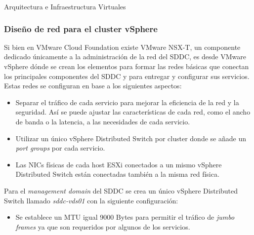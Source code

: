\begin{subsection}{Arquitectura e Infraestructura Virtuales\cite{CFVirtInfraes}}
\begin{itemize}
\end{itemize}
\subsubsection{Diseño de red para el cluster vSphere}
Si bien en VMware Cloud Foundation existe VMware NSX-T, un componente dedicado únicamente a la administración de la red del SDDC, es desde VMware vSphere dónde se crean los elementos para formar las redes básicas que conectan los principales componentes del SDDC y para entregar y configurar sus servicios. Estas redes se configuran en base a los siguientes aspectos: 
\begin{itemize}
    \item Separar el tráfico de cada servicio para mejorar la eficiencia de la red y la seguridad. Así se puede ajustar las características de cada red, como el ancho de banda o la latencia, a las necesidades de cada servicio.
    \item Utilizar un único vSphere Distributed Switch por cluster donde se añade un \textit{port groups} por cada servicio.
    \item Las NICs físicas de cada host ESXi conectados a un mismo vSphere Distributed Switch están conectadas también a la misma red física.
\end{itemize}
Para el \textit{management domain} del SDDC se crea un único vSphere Distributed Switch llamado \textit{sddc-vds01} con la siguiente configuración:
\begin{itemize}
    
    \item Se establece un MTU igual 9000 Bytes para permitir el tráfico de \textit{jumbo frames} ya que son requeridos por algunos de los servicios.
    

\end{itemize}
\end{subsection}
